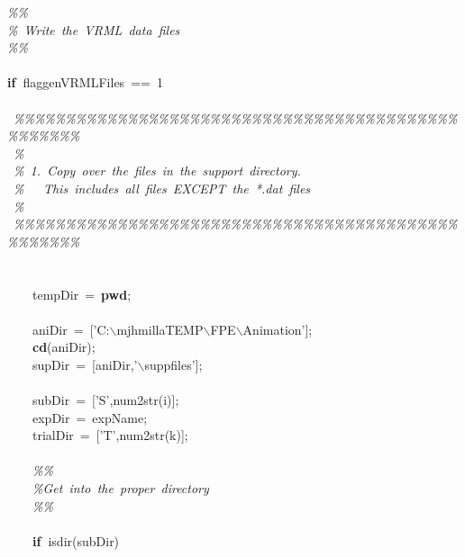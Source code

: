 \documentclass[singlecolumn,12pt]{article}
\newcommand{\hlstd}[1]{\textcolor[rgb]{0,0,0}{#1}}
\newcommand{\hlkey}[1]{\textcolor[rgb]{0,0,1}{\bf{#1}}}
\newcommand{\hlnum}[1]{\textcolor[rgb]{0.66,0,0.66}{#1}}
\newcommand{\hltyp}[1]{\textcolor[rgb]{0,0,1}{#1}}
\newcommand{\hlcom}[1]{\textcolor[rgb]{0.4,0.4,0.4}{\it{#1}}}
\begin{document}
\pagecolor{bgcolor} \noindent \ttfamily
\hlstd{}\hlcom{\%\%\\
}\hlstd{}\hlcom{\%\ Write\ the\ VRML\ data\ files\\
}\hlstd{}\hlcom{\%\%\mbox{}\\
}\hlstd{\\
}\hlkey{if\ }\hlstd{flag\textunderscore genVRMLFiles\ ==\ }\hlnum{1\mbox{}\\
\\
\ }\hlstd{}\hlcom{\%\%\%\%\%\%\%\%\%\%\%\%\%\%\%\%\%\%\%\%\%\%\%\%\%\%\%\%\%\%\%\%\%\%\%\%\%\%\%\%\%\%\%\%\%\%\%\%\%\%\\
}\hlstd{\ }\hlcom{\%\\
}\hlstd{\ }\hlcom{\%\ 1.\ Copy\ over\ the\ files\ in\ the\ support\ directory.\\
}\hlstd{\ }\hlcom{\%\ \ \ This\ includes\ all\ files\ EXCEPT\ the\ *.dat\ files \\
}\hlstd{\ }\hlcom{\%\\
}\hlstd{\ }\hlcom{\%\%\%\%\%\%\%\%\%\%\%\%\%\%\%\%\%\%\%\%\%\%\%\%\%\%\%\%\%\%\%\%\%\%\%\%\%\%\%\%\%\%\%\%\%\%\%\%\%\%\mbox{}\\
}\hlstd{\mbox{}\\
\\
\hlstd{\ \ \ \ }}\hltyp{tempDir\ }\hlstd{=\ }\hlkey{pwd}\hlstd{;\mbox{}\\
\\
\hlstd{\ \ \ \ }aniDir\ =\ ['C:$\backslash$mjhmilla\textunderscore TEMP$\backslash$FPE$\backslash$Animation'];\\
\hlstd{\ \ \ \ }}\hlkey{cd}\hlstd{(aniDir);\\
\hlstd{\ \ \ \ }supDir\ =\ [aniDir,'$\backslash$suppfiles'];\mbox{}\\
\\
\hlstd{\ \ \ \ }subDir\ =\ ['S',}\hltyp{num2str}\hlstd{(i)];\\
\hlstd{\ \ \ \ }expDir\ =\ expName;\\
\hlstd{\ \ \ \ }trialDir\ =\ ['T',}\hltyp{num2str}\hlstd{(k)];\mbox{}\\
\\
\hlstd{\ \ \ \ }}\hlcom{\%\%\\
}\hlstd{\hlstd{\ \ \ \ }}\hlcom{\%Get\ into\ the\ proper\ directory\\
}\hlstd{\hlstd{\ \ \ \ }}\hlcom{\%\%\mbox{}\\
}\hlstd{\\
\hlstd{\ \ \ \ }}\hlkey{if\ }\hlstd{isdir(subDir)\\
}
\end{document}
